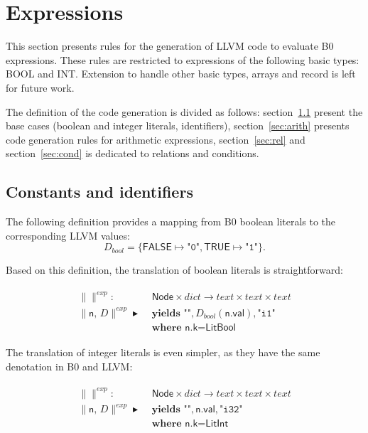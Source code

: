 \documentclass{article}
\newcommand{\trad}[2]{\ensuremath{\lVert \textsf{#1} \rVert^{\textit{#2}}}}
\DeclareMathOperator{\isdef}{\blacktriangleright}
\begin{document}
\section{Expressions}
\label{sec:expr}

This section presents rules for the generation of LLVM code to
evaluate B0 expressions. These rules are restricted to expressions of
the following basic types: \textsf{BOOL} and \textsf{INT}. Extension
to handle other basic types, arrays and record is left for future
work.

The definition of the code generation is divided as follows:
section~\ref{sec:const} present the base cases (boolean and integer
literals, identifiers), section~\ref{sec:arith} presents code
generation rules for arithmetic expressions, section~\ref{sec:rel} and
section~\ref{sec:cond} is dedicated to relations and conditions.

\subsection{Constants and identifiers}
\label{sec:const}

The following definition provides a mapping from B0 boolean literals
to the corresponding LLVM values:
$$D_{bool} = \{ \textsf{FALSE} \mapsto \texttt{"0"}, \textsf{TRUE} \mapsto \texttt{"1"} \}.$$

Based on this definition, the translation of boolean literals is straightforward:
\begin{framed}
\begin{align}
\begin{split}
  \trad{}{exp} : & \textsf{ Node} \times dict \rightarrow text \times text \times  text  \\
  \trad{n, $D$}{exp} \isdef & \textbf{ yields } \texttt{""}, D_{bool}(\textsf{n.val}), \texttt{"i1"} \\
  & \textbf{ where } \textsf{n.k} = \textsf{LitBool}
\end{split}
\end{align}
\end{framed}

The translation of integer literals is even simpler, as they have the
same denotation in B0 and LLVM:
\begin{framed}
\begin{align}
\begin{split}
 \trad{}{exp} : & \textsf{ Node} \times dict \rightarrow text  \times text \times  text\\
  \trad{n, $D$}{exp} \isdef & \textbf{ yields } \texttt{""}, \textsf{n.val}, \texttt{"i32"} \\
  & \textbf{ where } \textsf{n.k} = \textsf{LitInt}
\end{split}
\end{align}
\end{framed}
\end{document}
